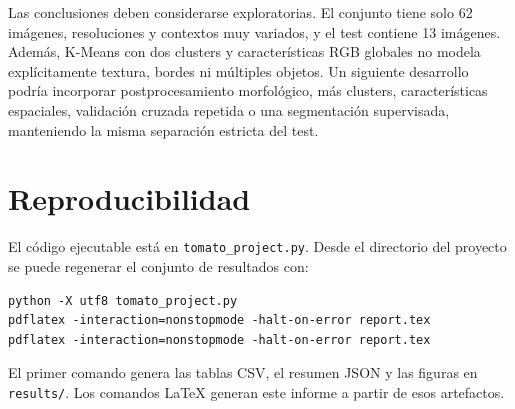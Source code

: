 \documentclass[11pt,a4paper]{article}
\begin{document}
Las conclusiones deben considerarse exploratorias. El conjunto tiene solo 62
imágenes, resoluciones y contextos muy variados, y el test contiene 13 imágenes.
Además, K-Means con dos clusters y características RGB globales no modela
explícitamente textura, bordes ni múltiples objetos. Un siguiente desarrollo podría
incorporar postprocesamiento morfológico, más clusters, características espaciales,
validación cruzada repetida o una segmentación supervisada, manteniendo la misma
separación estricta del test.

\section*{Reproducibilidad}

El código ejecutable está en \texttt{tomato\_project.py}. Desde el directorio del
proyecto se puede regenerar el conjunto de resultados con:

\begin{verbatim}
python -X utf8 tomato_project.py
pdflatex -interaction=nonstopmode -halt-on-error report.tex
pdflatex -interaction=nonstopmode -halt-on-error report.tex
\end{verbatim}

El primer comando genera las tablas CSV, el resumen JSON y las figuras en
\texttt{results/}. Los comandos LaTeX generan este informe a partir de esos
artefactos.
\end{document}
